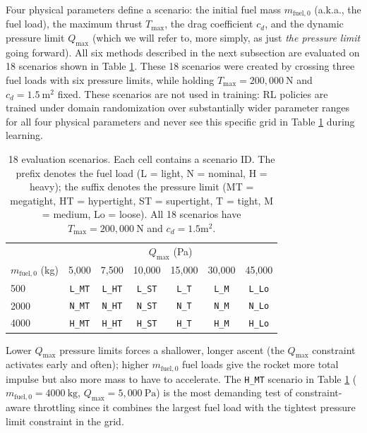 \documentclass[mnsc,sglanonrev]{informs4}
\begin{document}
Four physical parameters define a scenario: the initial fuel mass $m_{\mathrm{fuel},0}$ (a.k.a., the fuel load), the maximum thrust $T_{\max}$, the drag coefficient $c_d$, and the dynamic pressure limit $Q_{\max}$ (which we will refer to, more simply, as just \emph{the pressure limit} going forward). All six methods described in the next subsection are evaluated on 18 scenarios shown in Table \ref{tab:god_examples}. These 18 scenarios were created by crossing three fuel loads with six pressure limits, while holding $T_{\max}=200{,}000\ \mathrm{N}$ and $c_d=1.5\ \mathrm{m^2}$ fixed.
These scenarios are not used in training: RL policies are trained under domain randomization over substantially wider parameter ranges for all four physical parameters and never see this specific grid in Table \ref{tab:god_examples} during learning.

\begin{table}[h]
\centering
\caption{18 evaluation scenarios. Each cell contains a scenario ID. The prefix denotes the fuel load (L = light, N = nominal, H = heavy); the suffix denotes the pressure limit (MT = megatight, HT = hypertight, ST = supertight, T = tight, M = medium, Lo = loose). All 18 scenarios have $T_{\max}=200{,}000\ \mathrm{N}$ and $c_d=1.5 \mathrm{m^2}$.}
\label{tab:god_examples}
\renewcommand{\arraystretch}{1.15}
\begin{tabular}{@{}l|cccccc@{}}
\toprule
& \multicolumn{6}{c}{$Q_{\max}$ (Pa)} \\
$m_{\mathrm{fuel},0}$ (kg) & 5{,}000 & 7{,}500 & 10{,}000 & 15{,}000 & 30{,}000 & 45{,}000 \\
\midrule
500  & \texttt{L\_MT} & \texttt{L\_HT} & \texttt{L\_ST} & \texttt{L\_T} & \texttt{L\_M} & \texttt{L\_Lo} \\
2000 & \texttt{N\_MT} & \texttt{N\_HT} & \texttt{N\_ST} & \texttt{N\_T} & \texttt{N\_M} & \texttt{N\_Lo} \\
4000 & \texttt{H\_MT} & \texttt{H\_HT} & \texttt{H\_ST} & \texttt{H\_T} & \texttt{H\_M} & \texttt{H\_Lo} \\
\bottomrule
\end{tabular}
\end{table}

Lower $Q_{\max}$ pressure limits forces a shallower, longer ascent (the $Q_{\max}$ constraint activates early and often); higher $m_{\mathrm{fuel},0}$ fuel loads give the rocket more total impulse but also more mass to have to accelerate. The \texttt{H\_MT} scenario in Table \ref{tab:god_examples} ($m_{\mathrm{fuel},0}=4000\ \mathrm{kg}$, $Q_{\max}=5{,}000\ \mathrm{Pa}$) is the most demanding test of constraint-aware throttling since it combines the largest fuel load with the tightest pressure limit constraint in the grid.
\end{document}
